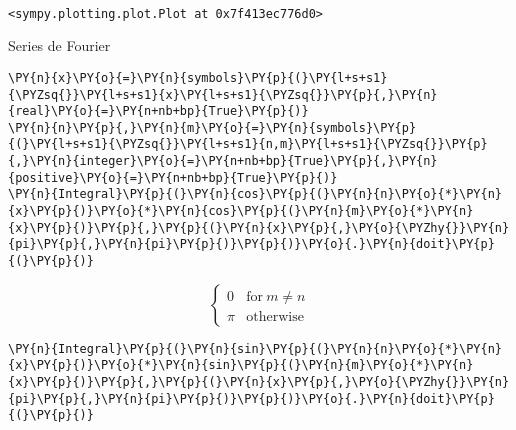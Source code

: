     \begin{center}
    \end{center}
    { \hspace*{\fill} \\}
    
            \begin{tcolorbox}[breakable, boxrule=.5pt, size=fbox, pad at break*=1mm, opacityfill=0]
\begin{Verbatim}[commandchars=\\\{\}]
<sympy.plotting.plot.Plot at 0x7f413ec776d0>
\end{Verbatim}
\end{tcolorbox}
        
    Series de Fourier 

    \begin{tcolorbox}[breakable, size=fbox, boxrule=1pt, pad at break*=1mm,colback=cellbackground, colframe=cellborder]
\begin{Verbatim}[commandchars=\\\{\}]
\PY{n}{x}\PY{o}{=}\PY{n}{symbols}\PY{p}{(}\PY{l+s+s1}{\PYZsq{}}\PY{l+s+s1}{x}\PY{l+s+s1}{\PYZsq{}}\PY{p}{,}\PY{n}{real}\PY{o}{=}\PY{n+nb+bp}{True}\PY{p}{)}
\PY{n}{n}\PY{p}{,}\PY{n}{m}\PY{o}{=}\PY{n}{symbols}\PY{p}{(}\PY{l+s+s1}{\PYZsq{}}\PY{l+s+s1}{n,m}\PY{l+s+s1}{\PYZsq{}}\PY{p}{,}\PY{n}{integer}\PY{o}{=}\PY{n+nb+bp}{True}\PY{p}{,}\PY{n}{positive}\PY{o}{=}\PY{n+nb+bp}{True}\PY{p}{)}
\PY{n}{Integral}\PY{p}{(}\PY{n}{cos}\PY{p}{(}\PY{n}{n}\PY{o}{*}\PY{n}{x}\PY{p}{)}\PY{o}{*}\PY{n}{cos}\PY{p}{(}\PY{n}{m}\PY{o}{*}\PY{n}{x}\PY{p}{)}\PY{p}{,}\PY{p}{(}\PY{n}{x}\PY{p}{,}\PY{o}{\PYZhy{}}\PY{n}{pi}\PY{p}{,}\PY{n}{pi}\PY{p}{)}\PY{p}{)}\PY{o}{.}\PY{n}{doit}\PY{p}{(}\PY{p}{)}
\end{Verbatim}
\end{tcolorbox}
 
            
    
    $$\begin{cases} 0 & \text{for}\: m \neq n \\\pi & \text{otherwise} \end{cases}$$

    

    \begin{tcolorbox}[breakable, size=fbox, boxrule=1pt, pad at break*=1mm,colback=cellbackground, colframe=cellborder]
\begin{Verbatim}[commandchars=\\\{\}]
\PY{n}{Integral}\PY{p}{(}\PY{n}{sin}\PY{p}{(}\PY{n}{n}\PY{o}{*}\PY{n}{x}\PY{p}{)}\PY{o}{*}\PY{n}{sin}\PY{p}{(}\PY{n}{m}\PY{o}{*}\PY{n}{x}\PY{p}{)}\PY{p}{,}\PY{p}{(}\PY{n}{x}\PY{p}{,}\PY{o}{\PYZhy{}}\PY{n}{pi}\PY{p}{,}\PY{n}{pi}\PY{p}{)}\PY{p}{)}\PY{o}{.}\PY{n}{doit}\PY{p}{(}\PY{p}{)}
\end{Verbatim}
\end{tcolorbox}
 
